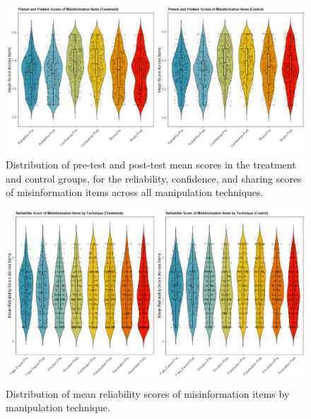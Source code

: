 \documentclass[empirical, authordate]{jote-new-article}
\begin{document}
\begin{figure}[t]

  \begin{fullwidth}
    \includegraphics[width=\linewidth]{media/image4.jpeg}
    \caption{Distribution of pre-test and post-test mean scores in the treatment and control groups, for the reliability, confidence, and sharing scores of misinformation items across all manipulation techniques.}
    \label{fig:figure4}
  \end{fullwidth}


\end{figure}




\begin{figure}[t]

  \begin{fullwidth}
    \includegraphics[width=\linewidth]{media/image3.jpeg}
    \caption{Distribution of mean reliability scores of misinformation items by manipulation technique. }
    \label{fig:figure5}
  \end{fullwidth}


\end{figure}
\end{document}
